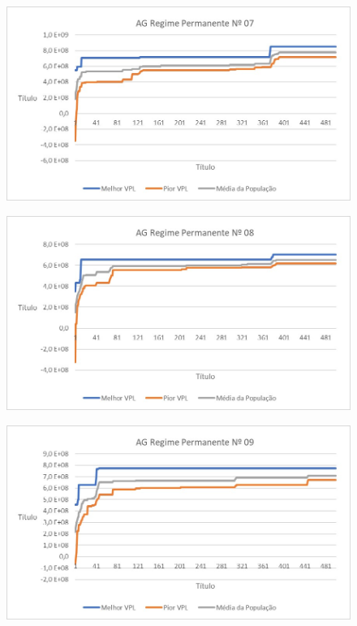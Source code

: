 \documentclass[12pt,a4paper]{report}
\begin{document}
\begin{figure}[H]
\centering

\includegraphics[scale=1]{ApB/AGRP/7}

\end{figure}

\begin{figure}[H]
\centering

\includegraphics[scale=1]{ApB/AGRP/8}

\end{figure}


\begin{figure}[H]
\centering

\includegraphics[scale=1]{ApB/AGRP/9}

\end{figure}
\end{document}
